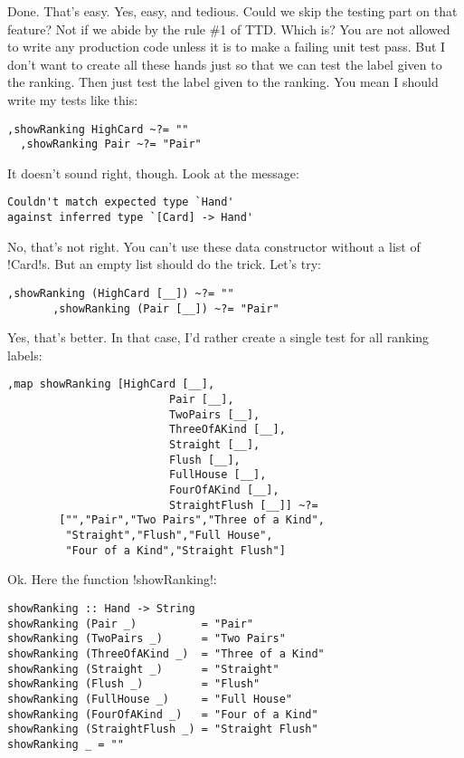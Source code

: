 \success Done. That's easy.
\lhN Yes, easy, and tedious. Could we skip the testing part on that feature?
\lhA Not if we abide by the rule \#1 of TTD.
\lhN Which is?
\lhA You are not allowed to write any production code unless it is to make a failing unit test pass.
\lhN But I don't want to create all these hands just so that we can test the label given to the ranking.
\lhA Then just test the label given to the ranking.
\lhN You mean I should write my tests like this:
\begin{lstlisting}[frame=single]
  ,showRanking HighCard ~?= ""
  ,showRanking Pair ~?= "Pair"
\end{lstlisting}
It doesn't sound right, though. Look at the message:
\begin{small}
\begin{verbatim}
Couldn't match expected type `Hand'
against inferred type `[Card] -> Hand'
\end{verbatim}
\end{small}
\lhA \error No, that's not right. You can't use these data constructor without a list of \il!Card!s.
But an empty list should do the trick.
\lhN Let's try:
\begin{lstlisting}[frame=single]
       ,showRanking (HighCard [__]) ~?= ""
       ,showRanking (Pair [__]) ~?= "Pair"
\end{lstlisting}
\lhA \success Yes, that's better.
\lhN In that case, I'd rather create a single test for all ranking labels:
\begin{lstlisting}[frame=single]
       ,map showRanking [HighCard [__],
                         Pair [__],
                         TwoPairs [__],
                         ThreeOfAKind [__],
                         Straight [__],
                         Flush [__],
                         FullHouse [__],
                         FourOfAKind [__],
                         StraightFlush [__]] ~?=
        ["","Pair","Two Pairs","Three of a Kind",
         "Straight","Flush","Full House",
         "Four of a Kind","Straight Flush"]
\end{lstlisting}
\lhA Ok. Here the function \il!showRanking!:
\begin{lstlisting}[frame=single]
showRanking :: Hand -> String
showRanking (Pair _)          = "Pair" 
showRanking (TwoPairs _)      = "Two Pairs" 
showRanking (ThreeOfAKind _)  = "Three of a Kind" 
showRanking (Straight _)      = "Straight" 
showRanking (Flush _)         = "Flush" 
showRanking (FullHouse _)     = "Full House" 
showRanking (FourOfAKind _)   = "Four of a Kind"
showRanking (StraightFlush _) = "Straight Flush"
showRanking _ = ""
\end{lstlisting}
